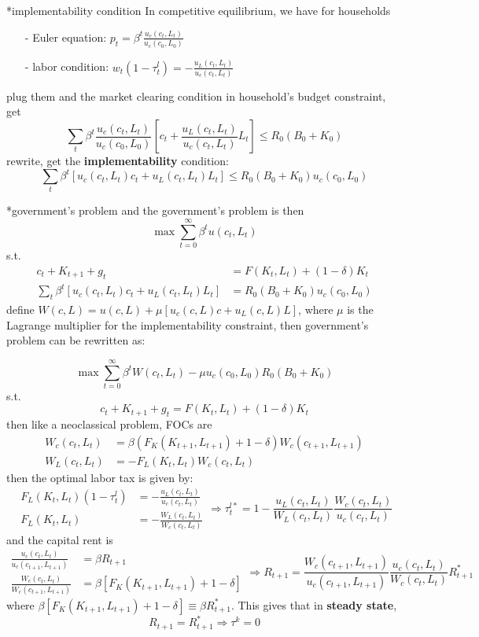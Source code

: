 \documentclass[10pt,landscape,a4paper]{article}
\makeatletter
\renewcommand{\subsubsection}{\@startsection{subsubsection}{1}{0mm}{.2ex}{.2ex}{\bfseries}}
\makeatother
\begin{document}
\begin{multicols*}{3}
\subsubsection*{implementability condition}
In competitive equilibrium, we have for households
\begin{itemize}
    \item[-] Euler equation: $p_t =\beta^t \frac{u_c(c_t,L_t)}{u_c(c_0,L_0)}$
    \item[-] labor condition: $w_t(1-\tau^l_t)=-\frac{u_L(c_t,L_t)}{u_c(c_t,L_t)}$
\end{itemize}
plug them and the market clearing condition in household's budget constraint, get
$$
\sum_t \beta^t\frac{u_c(c_t,L_t)}{u_c(c_0,L_0)}\left[c_t +\frac{u_L(c_t,L_t)}{u_c(c_t,L_t)}L_t\right] \leq R_0(B_0+K_0)
$$
rewrite, get the \textbf{\color{myred}implementability} condition:
$$
\sum_t \beta^t [u_c(c_t,L_t)c_t +u_L(c_t,L_t)L_t] \leq R_0(B_0+K_0)u_c(c_0,L_0)
$$

\subsubsection*{government's problem}
and the government's problem is then
$$
\max \sum^{\infty}_{t=0}\beta^t u(c_t,L_t)
$$
s.t.
\begin{align*}
    c_t+ K_{t+1} + g_t &= F(K_t,L_t) + (1-\delta)K_t\\
    \sum_t \beta^t \left[u_c(c_t,L_t)c_t + u_L(c_t,L_t)L_t\right] &= R_0(B_0+K_0)u_c(c_0,L_0)
\end{align*}
define $W(c,L) = u(c,L)+\mu[u_c(c,L)c+u_L(c,L)L]$, where $\mu$ is the Lagrange multiplier for the implementability constraint, then government's problem can be rewritten as:

$$
\max \sum^{\infty}_{t=0}\beta^t W(c_t,L_t) - \mu u_c(c_0,L_0)R_0(B_0+K_0)
$$
s.t.
$$
c_t+ K_{t+1} + g_t = F(K_t,L_t) + (1-\delta)K_t
$$
then like a neoclassical problem, FOCs are
\begin{align*}
    W_c(c_t,L_t) &= \beta (F_K(K_{t+1},L_{t+1})+1-\delta) W_c(c_{t+1},L_{t+1}) \\
    W_L(c_t,L_t) &= -F_L(K_t,L_t)W_c(c_t,L_t)
\end{align*}
then the optimal labor tax is given by:
$$
\begin{aligned}
    F_L(K_t,L_t)(1-\tau^l_t) &=-\frac{u_L(c_t,L_t)}{u_c(c_t,L_t)}\\
    F_L(K_t,L_t) &= -\frac{W_L(c_t,L_t)}{W_c(c_t,L_t)}
\end{aligned} \Rightarrow \tau_t^{l*} = 1-\frac{u_L(c_t,L_t)}{W_L(c_t,L_t)}\frac{W_c(c_t,L_t)}{u_c(c_t,L_t)}
$$
and the capital rent is
$$
\begin{aligned}
    \frac{u_c(c_t,L_t)}{u_c(c_{t+1},L_{t+1})} &= \beta R_{t+1}\\
    \frac{W_c(c_t,L_t)}{W_c(c_{t+1},L_{t+1})} &= \beta[F_K(K_{t+1},L_{t+1})+1-\delta]
\end{aligned} \Rightarrow R_{t+1} = \frac{W_c(c_{t+1},L_{t+1})}{u_c(c_{t+1},L_{t+1})}\frac{u_c(c_t,L_t)}{W_c(c_t,L_t)}R^*_{t+1}
$$
where $\beta[F_K(K_{t+1},L_{t+1})+1-\delta]\equiv \beta R^*_{t+1}$. This gives that in \textbf{steady state}, 
$$R_{t+1}=R^*_{t+1}\Rightarrow \tau^k=0$$


\end{multicols*}
\end{document}
